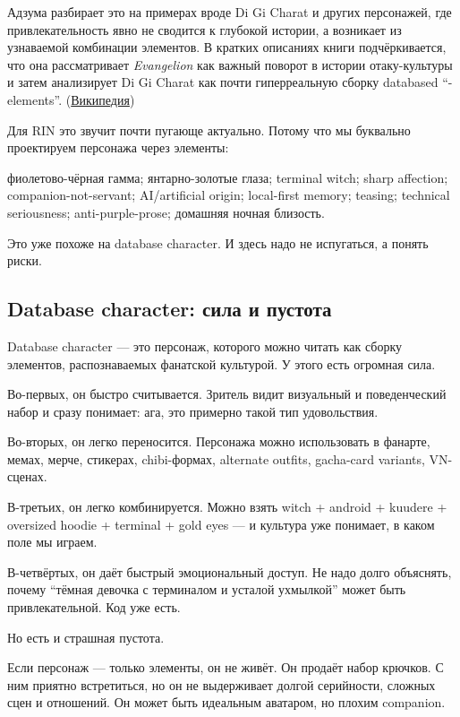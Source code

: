 Адзума разбирает это на примерах вроде Di Gi Charat и других персонажей,
где привлекательность явно не сводится к глубокой истории, а возникает
из узнаваемой комбинации элементов. В кратких описаниях книги
подчёркивается, что она рассматривает \emph{Evangelion} как важный
поворот в истории отаку-культуры и затем анализирует Di Gi Charat как
почти гиперреальную сборку databased ``-elements''.
(\href{https://en.wikipedia.org/wiki/Otaku\%3A_Japan\%27s_Database_Animals?utm_source=chatgpt.com}{Википедия})

Для RIN это звучит почти пугающе актуально. Потому что мы буквально
проектируем персонажа через элементы:

фиолетово-чёрная гамма; янтарно-золотые глаза; terminal witch; sharp
affection; companion-not-servant; AI/\hspace{0pt}artificial origin; local-first
memory; teasing; technical seriousness; anti-purple-prose; домашняя
ночная близость.

Это уже похоже на database character. И здесь надо не испугаться, а
понять риски.

\subsection*{Database character: сила и пустота}

Database character --- это персонаж, которого можно читать как сборку
элементов, распознаваемых фанатской культурой. У этого есть огромная
сила.

Во-первых, он быстро считывается. Зритель видит визуальный и
поведенческий набор и сразу понимает: ага, это примерно такой тип
удовольствия.

Во-вторых, он легко переносится. Персонажа можно использовать в фанарте,
мемах, мерче, стикерах, chibi-формах, alternate outfits, gacha-card
variants, VN-сценах.

В-третьих, он легко комбинируется. Можно взять witch + android + kuudere
+ oversized hoodie + terminal + gold eyes --- и культура уже понимает, в
каком поле мы играем.

В-четвёртых, он даёт быстрый эмоциональный доступ. Не надо долго
объяснять, почему ``тёмная девочка с терминалом и усталой ухмылкой''
может быть привлекательной. Код уже есть.

Но есть и страшная пустота.

Если персонаж --- только элементы, он не живёт. Он продаёт набор
крючков. С ним приятно встретиться, но он не выдерживает долгой
серийности, сложных сцен и отношений. Он может быть идеальным аватаром,
но плохим companion.

